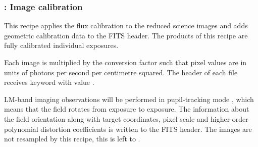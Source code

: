 \subsubsection{:  Image calibration}
\label{lm_img_calibrate}
\label{rec:metis_lm_img_calibrate}
\label{rec:lm_img_calibrate}
\label{sssec:lm_img_calibrate}

This recipe applies the flux calibration to the reduced science
images and adds geometric calibration data to the FITS header. The
products of this recipe are fully calibrated individual exposures.

Each image is multiplied by the conversion factor such that pixel
values are in units of photons per second per centimetre squared. The
header of each file receives keyword  with value %
.


LM-band imaging observations will be performed in pupil-tracking mode
\cite{METIS-operational_concept}, which means that the field rotates
from exposure to exposure.  The information about the field
orientation along with target coordinates, pixel scale and
higher-order polynomial distortion coefficients is written to the FITS
header. The images are not resampled by this recipe, this is left to
 .



